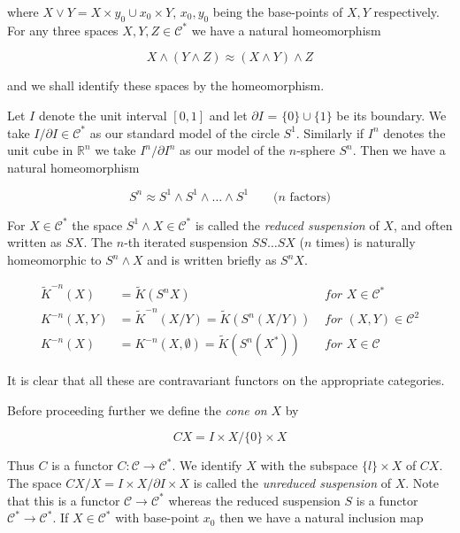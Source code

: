 where $X \vee Y = X \times y_0 \cup x_0 \times Y$, $x_0, y_0$ being the base-points of $X, Y$ respectively. For any three spaces $X, Y, Z \in \mathcal{C}^*$ we have a natural homeomorphism

\begin{equation*}
    X \wedge (Y \wedge Z) \approx (X \wedge Y) \wedge Z
\end{equation*}

and we shall identify these spaces by the homeomorphism. \par 

Let $I$ denote the unit interval $[0, 1]$ and let $\partial I$ = $\{0\} \cup \{1\}$ be its boundary. We take $I/\partial I \in \mathcal{C}^*$ as our standard model of the circle $S^1$. Similarly if $I^n$ denotes the unit cube in $\mathbb{R}^n$ we take $I^n/\partial I^n$ as our model of the $n$-sphere $S^n$. Then we have a natural homeomorphism

\begin{equation*}
S^n \approx S^1 \wedge S^1 \wedge \ldots \wedge S^1 \qquad \text{($n$ factors)}
\end{equation*}

For $X \in \mathcal{C}^*$ the space $S^1 \wedge X  \in \mathcal{C}^*$ is called the \textit{reduced suspension} of $X$, and often written as $SX$. The $n$-th iterated suspension $SS \ldots SX$ ($n$ times) is naturally homeomorphic to $S^n \wedge X$ and is written briefly as $S^n X$.

\begin{align*}
    \tilde{K}^{-n}(X) &= \tilde{K}(S^n X) & \textit{ for } X \in \mathcal{C}^* \\
    K^{-n}(X, Y) &= \tilde{K}^{-n}(X/Y) = \tilde{K}(S^n(X/Y)) & \textit{ for } (X, Y) \in \mathcal{C}^2 \\
    K^{-n}(X) &= K^{-n}(X, \emptyset) = \tilde{K}(S^n(X^*)) & \textit{ for } X \in \mathcal{C}
\end{align*}

It is clear that all these are contravariant functors on the appropriate categories. \par

Before proceeding further we define the \textit{cone on} $X$ by

\begin{equation*}
    CX = I \times X/\{0\} \times X
\end{equation*}

Thus $C$ is a functor $C: \mathcal{C} \to \mathcal{C}^*$. We identify $X$ with the subspace $\{l\} \times X$ of $CX$. The space $CX/X = I \times X/\partial I \times X$ is called the \textit{unreduced suspension} of $X$. Note that this is a functor $\mathcal{C} \to \mathcal{C}^*$ whereas the reduced suspension $S$ is a functor $\mathcal{C}^* \to \mathcal{C}^*$. If $X \in \mathcal{C}^*$ with base-point $x_0$ then we have a natural inclusion map

